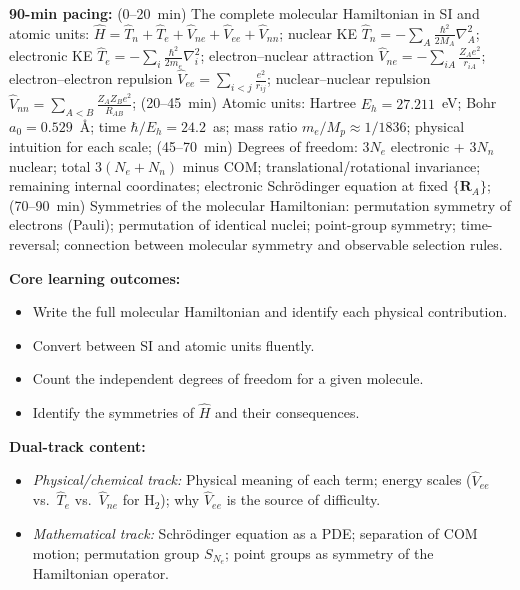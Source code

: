 \documentclass[11pt,a4paper]{article}
\begin{document}
\begin{tcolorbox}[chembox, title={Module~III.1 / L01: The Molecular Hamiltonian}]
\textbf{90-min pacing:} (0--20~min) The complete molecular Hamiltonian in SI and atomic units: $\hat{H}=\hat{T}_n+\hat{T}_e+\hat{V}_{ne}+\hat{V}_{ee}+\hat{V}_{nn}$; nuclear KE $\hat{T}_n=-\sum_A\tfrac{\hbar^2}{2M_A}\nabla_A^2$; electronic KE $\hat{T}_e=-\sum_i\tfrac{\hbar^2}{2m_e}\nabla_i^2$; electron--nuclear attraction $\hat{V}_{ne}=-\sum_{iA}\tfrac{Z_Ae^2}{r_{iA}}$; electron--electron repulsion $\hat{V}_{ee}=\sum_{i<j}\tfrac{e^2}{r_{ij}}$; nuclear--nuclear repulsion $\hat{V}_{nn}=\sum_{A<B}\tfrac{Z_AZ_Be^2}{R_{AB}}$; (20--45~min) Atomic units: Hartree $E_h=27.211$~eV; Bohr $a_0=0.529$~\AA; time $\hbar/E_h=24.2$~as; mass ratio $m_e/M_p\approx1/1836$; physical intuition for each scale; (45--70~min) Degrees of freedom: $3N_e$ electronic + $3N_n$ nuclear; total $3(N_e+N_n)$ minus COM; translational/rotational invariance; remaining internal coordinates; electronic Schr\"odinger equation at fixed $\{\mathbf{R}_A\}$; (70--90~min) Symmetries of the molecular Hamiltonian: permutation symmetry of electrons (Pauli); permutation of identical nuclei; point-group symmetry; time-reversal; connection between molecular symmetry and observable selection rules.

\medskip\textbf{Core learning outcomes:}
\begin{itemize}[leftmargin=1.4em,topsep=2pt,itemsep=1pt]
  \item Write the full molecular Hamiltonian and identify each physical contribution.
  \item Convert between SI and atomic units fluently.
  \item Count the independent degrees of freedom for a given molecule.
  \item Identify the symmetries of $\hat{H}$ and their consequences.
\end{itemize}

\medskip\textbf{Dual-track content:}
\begin{itemize}[leftmargin=1.4em,topsep=2pt,itemsep=1pt]
  \item \textit{Physical/chemical track:} Physical meaning of each term; energy scales ($\hat{V}_{ee}$ vs.\ $\hat{T}_e$ vs.\ $\hat{V}_{ne}$ for H$_2$); why $\hat{V}_{ee}$ is the source of difficulty.
  \item \textit{Mathematical track:} Schr\"odinger equation as a PDE; separation of COM motion; permutation group $S_{N_e}$; point groups as symmetry of the Hamiltonian operator.
\end{itemize}


\end{tcolorbox}
\end{document}
